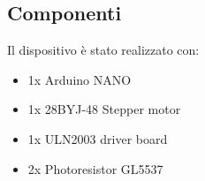 \documentclass[11pt,oneside,a4paper]{article}
\begin{document}
\subsection{Componenti}
Il dispositivo è stato realizzato con:
\begin{itemize}
    \item 1x Arduino NANO
    \item 1x 28BYJ-48 Stepper motor
    \item 1x ULN2003 driver board
    \item 2x Photoresistor GL5537
\end{itemize}

\end{document}
